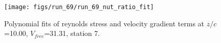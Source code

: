 \begin{figure}[H]
\centering
\texttt{[image: figs/run\_69/run\_69\_nut\_ratio\_fit]}
\caption{Polynomial fits of reynolds stress and velocity gradient terms at $z/c$=10.00, $V_{free}$=31.31, station 7.}
\label{fig:run_69_nut_ratio_fit}
\end{figure}


